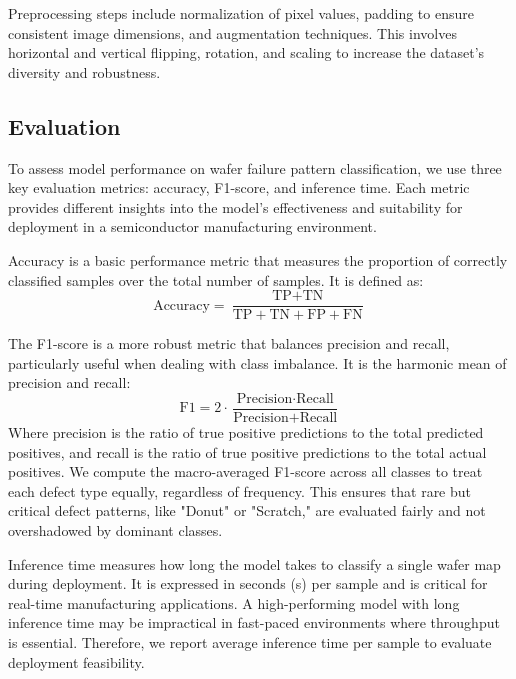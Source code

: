 \documentclass[conference]{IEEEtran}
\begin{document}
Preprocessing steps include normalization of pixel values, padding to ensure consistent image dimensions, and augmentation techniques. 
This involves horizontal and vertical flipping, rotation, and scaling to increase the dataset's diversity and robustness.


\subsection{Evaluation}
To assess model performance on wafer failure pattern classification, we use three key evaluation metrics: accuracy, F1-score, and inference time. 
Each metric provides different insights into the model's effectiveness and suitability for deployment in a semiconductor manufacturing environment.

Accuracy is a basic performance metric that measures the proportion of correctly classified samples over the total number of samples. 
It is defined as:
\begin{equation}
    \text{Accuracy} = \frac{\text{TP} + \text{TN}}{\text{TP} + \text{TN} + \text{FP} + \text{FN}}
\end{equation}

The F1-score is a more robust metric that balances precision and recall, particularly useful when dealing with class imbalance. 
It is the harmonic mean of precision and recall:
\begin{equation}
    \text{F1} = 2 \cdot \frac{\text{Precision} \cdot \text{Recall}}{\text{Precision} + \text{Recall}}
\end{equation}
Where precision is the ratio of true positive predictions to the total predicted positives, and recall is the ratio of true positive predictions to the total actual positives.
We compute the macro-averaged F1-score across all classes to treat each defect type equally, regardless of frequency. 
This ensures that rare but critical defect patterns, like "Donut" or "Scratch," are evaluated fairly and not overshadowed by dominant classes.

Inference time measures how long the model takes to classify a single wafer map during deployment. 
It is expressed in seconds (s) per sample and is critical for real-time manufacturing applications. 
A high-performing model with long inference time may be impractical in fast-paced environments where throughput is essential. 
Therefore, we report average inference time per sample to evaluate deployment feasibility.
\end{document}

